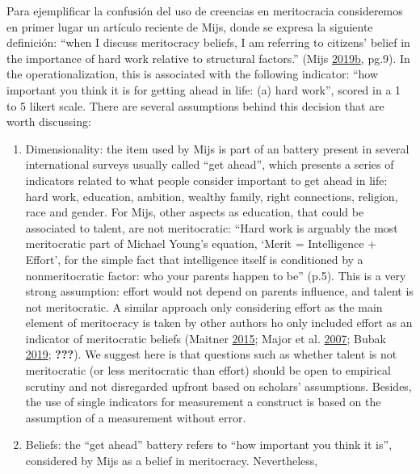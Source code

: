 \documentclass[
]{article}
\begin{document}
Para ejemplificar la confusión del uso de creencias en meritocracia
consideremos en primer lugar un artículo reciente de Mijs, donde se
expresa la siguiente definición: ``when I discuss meritocracy beliefs, I
am referring to citizens' belief in the importance of hard work relative
to structural factors.'' (Mijs
\protect\hyperlink{ref-mijs_paradox_2019}{2019}\protect\hyperlink{ref-mijs_paradox_2019}{b},
pg.9). In the operationalization, this is associated with the following
indicator: ``how important you think it is for getting ahead in life:
(a) hard work'', scored in a 1 to 5 likert scale. There are several
assumptions behind this decision that are worth discussing:

\begin{enumerate}
\def\labelenumi{\alph{enumi}.}
\item
  Dimensionality: the item used by Mijs is part of an battery present in
  several international surveys usually called ``get ahead'', which
  presents a series of indicators related to what people consider
  important to get ahead in life: hard work, education, ambition,
  wealthy family, right connections, religion, race and gender. For
  Mijs, other aspects as education, that could be associated to talent,
  are not meritocratic: ``Hard work is arguably the most meritocratic
  part of Michael Young's equation, `Merit = Intelligence + Effort', for
  the simple fact that intelligence itself is conditioned by a
  nonmeritocratic factor: who your parents happen to be'' (p.5). This is
  a very strong assumption: effort would not depend on parents
  influence, and talent is not meritocratic. A similar approach only
  considering effort as the main element of meritocracy is taken by
  other authors ho only included effort as an indicator of meritocratic
  beliefs (Maitner
  \protect\hyperlink{ref-MaitnerEmotionalreactionsunequal2015}{2015};
  Major et al.
  \protect\hyperlink{ref-MajorPerceiveddiscriminationworldview2007}{2007};
  Bubak
  \protect\hyperlink{ref-BubakPerceptionsmeritocracynote2019}{2019};
  {\textbf{???}}). We suggest here is that questions such as whether
  talent is not meritocratic (or less meritocratic than effort) should
  be open to empirical scrutiny and not disregarded upfront based on
  scholars' assumptions. Besides, the use of single indicators for
  measurement a construct is based on the assumption of a measurement
  without error.
\item
  Beliefs: the ``get ahead'' battery refers to ``how important you think
  it is'', considered by Mijs as a belief in meritocracy. Nevertheless,

\end{enumerate}
\end{document}
